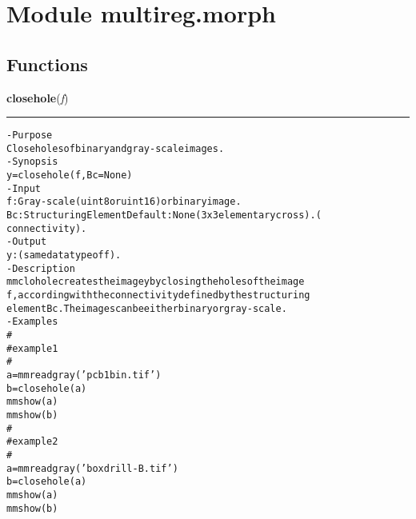 %
%
%


\section{Module multireg.morph}

    \label{multireg:morph}


  \subsection{Functions}

    \label{multireg:morph:closehole}
    \vspace{0.5ex}

    \begin{boxedminipage}{\textwidth}

    \raggedright \textbf{closehole}(\textit{f})

    \vspace{-1.5ex}

    \rule{\textwidth}{0.5\fboxrule}
\begin{alltt}
- Purpose
    Close holes of binary and gray-scale images.
- Synopsis
    y = closehole(f, Bc=None)
- Input
    f:  Gray-scale (uint8 or uint16) or binary image.
    Bc: Structuring Element Default: None (3x3 elementary cross). (
        connectivity).
- Output
    y: (same datatype of f ).
- Description
    mmclohole creates the image y by closing the holes of the image
    f , according with the connectivity defined by the structuring
    element Bc .The images can be either binary or gray-scale.
- Examples
    \#
    \#   example 1
    \#
    a = mmreadgray('pcb1bin.tif')
    b = closehole(a)
    mmshow(a)
    mmshow(b)
    \#
    \#   example 2
    \#
    a = mmreadgray('boxdrill-B.tif')
    b = closehole(a)
    mmshow(a)
    mmshow(b)\end{alltt}

    \vspace{1ex}

    \end{boxedminipage}

